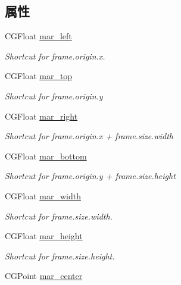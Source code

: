 \subsection*{属性}
\begin{DoxyCompactItemize}
\item 
C\+G\+Float \hyperlink{category_c_a_layer_07_m_a_r_e_x_08_a7f1a84a53bbfa59ce0595382c7c3f89e}{mar\+\_\+left}
\begin{DoxyCompactList}\small\item\em Shortcut for frame.\+origin.\+x. \end{DoxyCompactList}\item 
C\+G\+Float \hyperlink{category_c_a_layer_07_m_a_r_e_x_08_aa9497b8944a58d954047b0f976d523d9}{mar\+\_\+top}
\begin{DoxyCompactList}\small\item\em Shortcut for frame.\+origin.\+y \end{DoxyCompactList}\item 
C\+G\+Float \hyperlink{category_c_a_layer_07_m_a_r_e_x_08_ad07aa56bf6993cc6704e6bcf1279dc01}{mar\+\_\+right}
\begin{DoxyCompactList}\small\item\em Shortcut for frame.\+origin.\+x + frame.\+size.\+width \end{DoxyCompactList}\item 
C\+G\+Float \hyperlink{category_c_a_layer_07_m_a_r_e_x_08_a2bf08bd9141d4531f89438cf7934628c}{mar\+\_\+bottom}
\begin{DoxyCompactList}\small\item\em Shortcut for frame.\+origin.\+y + frame.\+size.\+height \end{DoxyCompactList}\item 
C\+G\+Float \hyperlink{category_c_a_layer_07_m_a_r_e_x_08_af7180b908e7a9c9993072170e7323bd1}{mar\+\_\+width}
\begin{DoxyCompactList}\small\item\em Shortcut for frame.\+size.\+width. \end{DoxyCompactList}\item 
C\+G\+Float \hyperlink{category_c_a_layer_07_m_a_r_e_x_08_ac9d64017739ef48ebec61ab6b0fc779c}{mar\+\_\+height}
\begin{DoxyCompactList}\small\item\em Shortcut for frame.\+size.\+height. \end{DoxyCompactList}\item 
C\+G\+Point \hyperlink{category_c_a_layer_07_m_a_r_e_x_08_a941902ae31856e77bf506391f4ba4d04}{mar\+\_\+center}

\end{DoxyCompactItemize}
